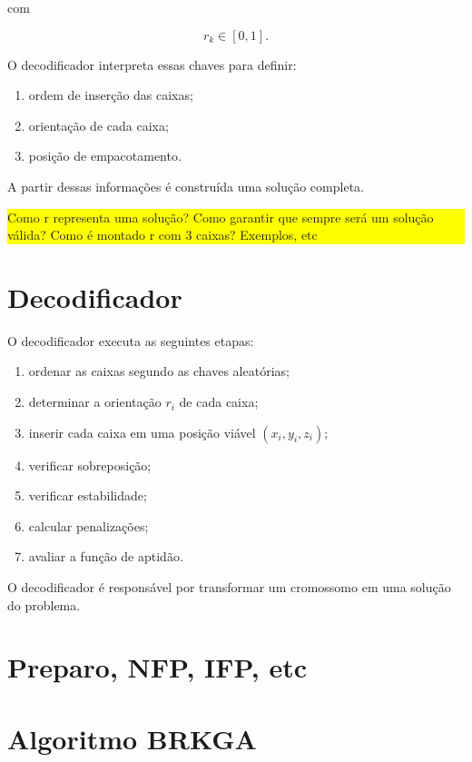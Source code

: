 \documentclass[12pt]{article}
\begin{document}
com

\[
r_k \in [0,1].
\]

O decodificador interpreta essas chaves para definir:

\begin{enumerate}
\item ordem de inserção das caixas;
\item orientação de cada caixa;
\item posição de empacotamento.
\end{enumerate}

A partir dessas informações é construída uma solução completa.

\colorbox{yellow}{
    \begin{minipage}{0.9\linewidth}
        Como r representa uma solução? Como garantir que sempre será um solução válida? Como é montado r com 3 caixas? Exemplos, etc
    \end{minipage}
}

\section{Decodificador}

O decodificador executa as seguintes etapas:

\begin{enumerate}
\item ordenar as caixas segundo as chaves aleatórias;
\item determinar a orientação $r_i$ de cada caixa;
\item inserir cada caixa em uma posição viável $(x_i, y_i, z_i)$;
\item verificar sobreposição;
\item verificar estabilidade;
\item calcular penalizações;
\item avaliar a função de aptidão.
\end{enumerate}

O decodificador é responsável por transformar um cromossomo em uma solução do problema.

\section{Preparo, NFP, IFP, etc}


\section{Algoritmo BRKGA}
\end{document}
